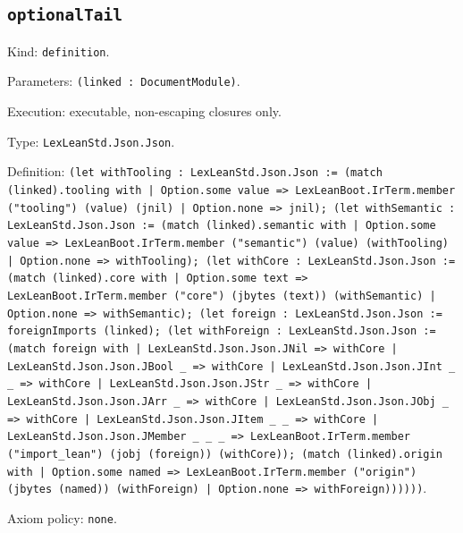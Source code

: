 \documentclass[11pt]{article}
\begin{document}
\subsection*{\texttt{optionalTail}}
\noindent Kind: \texttt{definition}.\par
\noindent Parameters: \texttt{(linked : DocumentModule)}.\par
\noindent Execution: executable, non-escaping closures only.\par
\noindent Type: \texttt{LexLeanStd.Json.Json}.\par
\noindent Definition: \texttt{(let withTooling : LexLeanStd.Json.Json := (match (linked).tooling with | Option.some value => LexLeanBoot.IrTerm.member ("tooling") (value) (jnil) | Option.none => jnil); (let withSemantic : LexLeanStd.Json.Json := (match (linked).semantic with | Option.some value => LexLeanBoot.IrTerm.member ("semantic") (value) (withTooling) | Option.none => withTooling); (let withCore : LexLeanStd.Json.Json := (match (linked).core with | Option.some text => LexLeanBoot.IrTerm.member ("core") (jbytes (text)) (withSemantic) | Option.none => withSemantic); (let foreign : LexLeanStd.Json.Json := foreignImports (linked); (let withForeign : LexLeanStd.Json.Json := (match foreign with | LexLeanStd.Json.Json.JNil => withCore | LexLeanStd.Json.Json.JBool \_ => withCore | LexLeanStd.Json.Json.JInt \_ \_ => withCore | LexLeanStd.Json.Json.JStr \_ => withCore | LexLeanStd.Json.Json.JArr \_ => withCore | LexLeanStd.Json.Json.JObj \_ => withCore | LexLeanStd.Json.Json.JItem \_ \_ => withCore | LexLeanStd.Json.Json.JMember \_ \_ \_ => LexLeanBoot.IrTerm.member ("import\_lean") (jobj (foreign)) (withCore)); (match (linked).origin with | Option.some named => LexLeanBoot.IrTerm.member ("origin") (jbytes (named)) (withForeign) | Option.none => withForeign))))))}.\par
\noindent Axiom policy: \texttt{none}.\par
\end{document}
